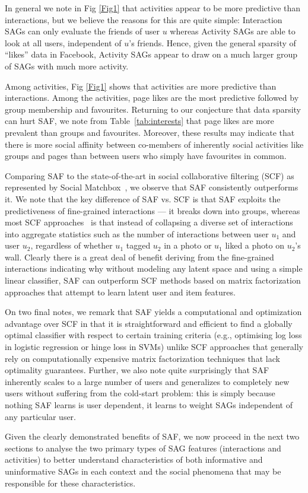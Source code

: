 In general we note in Fig \ref{Fig1} that activities appear to be
more predictive than interactions, but we believe the reasons for this
are quite simple: Interaction SAGs can only evaluate the friends of
user $u$ whereas Activity SAGs are able to look at all users,
independent of $u$'s friends.
Hence, given the general sparsity of ``likes'' data in Facebook, 
Activity SAGs appear to draw on a much larger group of SAGs
with much more activity.

Among activities, Fig \ref{Fig1} shows that activities are more
predictive than interactions. Among the activities, page likes are the
most predictive followed by group membership and favourites.
Returning to our conjecture that data sparsity can hurt SAF, we note
from Table~\ref{tab:interests} that page likes are more prevalent than
groups and favourites.  Moreover, these results may indicate that
there is more social affinity between co-members of inherently social
activities like groups and pages than between users who simply have
favourites in common.

Comparing SAF to the state-of-the-art in social
collaborative filtering (SCF) as represented by Social
Matchbox~\cite{Noel2012NOF}, we observe that SAF consistently
outperforms it.  We note that the key difference of SAF vs. SCF is
that SAF exploits the predictiveness of fine-grained interactions ---
it breaks down into groups, whereas most SCF
approaches~\cite{Noel2012NOF,lla,socinf,sr,rrmf,sorec,ste} is that
instead of collapsing a diverse set of interactions into aggregate
statistics such as the number of interactions between user $u_1$ and
user $u_2$, regardless of whether $u_1$ tagged $u_2$ in a photo or
$u_1$ liked a photo on $u_2$'s wall.  Clearly there is a great deal of
benefit deriving from the fine-grained interactions indicating why
without modeling any latent space and using a simple linear
classifier, SAF can outperform SCF methods based on matrix
factorization approaches that attempt to learn latent user and item
features.

On two final notes, we remark that SAF yields a computational and
optimization advantage over SCF in that it is straightforward and
efficient to find a globally optimal classifier with respect to certain training
criteria (e.g., optimising log loss in logistic regression or hinge
loss in SVMs) unlike SCF approaches that generally rely on
computationally expensive matrix factorization techniques that lack
optimality guarantees.  Further, we also note quite surprisingly that
SAF inherently scales to a large number of users and generalizes to
completely new users without suffering from the cold-start problem:
this is simply because nothing SAF learns is user dependent, it learns
to weight SAGs independent of any particular user.

Given the clearly demonstrated benefits of SAF, we now proceed in the
next two sections to analyse the two primary types of SAG features
(interactions and activities) to better understand characteristics of
both informative and uninformative SAGs in each context and the social
phenomena that may be responsible for these characteristics.

